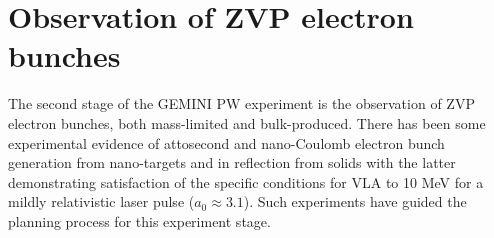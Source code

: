 \section{Observation of ZVP electron bunches}\label{sec:ch4-zvp}
The second stage of the GEMINI PW experiment is the observation of ZVP electron bunches, both mass-limited and bulk-produced. There has been some experimental evidence of attosecond and nano-Coulomb electron bunch generation from nano-targets \cite{cardenasSubcycleDynamicsRelativistic2019,hornyGenerationSingleAttosecond2021} and in reflection from solids \cite{linIsolatedAttosecondElectron2020, thevenetVacuumLaserAcceleration2016} with the latter demonstrating satisfaction of the specific conditions for \ac{VLA} to 10 MeV for a mildly relativistic laser pulse ($a_0 \approx 3.1$). Such experiments have guided the planning process for this experiment stage.

